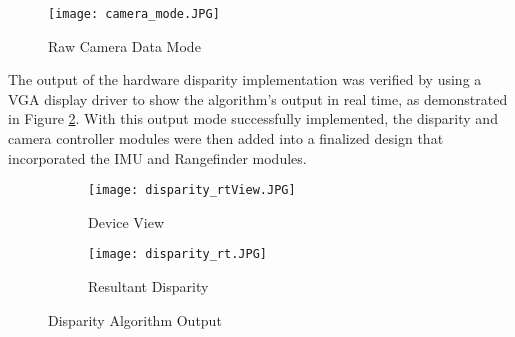 \par
\begin{figure}[H]
	\centerline{
	\texttt{[image: camera\_mode.JPG]}
	}
	\caption{Raw Camera Data Mode}
	\label{camOutMode}
\end{figure}
\par
The output of the hardware disparity implementation was verified by using a VGA display driver to show the algorithm's output in real time, as demonstrated in Figure \ref{disparityFin}. With this output mode successfully implemented, the disparity and camera controller modules were then added into a finalized design that incorporated the IMU and Rangefinder modules.
\par
\begin{figure}[H] 
	\begin{subfigure}{0.5\textwidth}
	\centering
		\texttt{[image: disparity\_rtView.JPG]}
		\caption{Device View}
	\end{subfigure}
	\begin{subfigure}{0.5\textwidth}
	\centering
		\texttt{[image: disparity\_rt.JPG]}
		\caption{Resultant Disparity}
	\end{subfigure}
	\caption{Disparity Algorithm Output}
	\label{disparityFin}
\end{figure}
